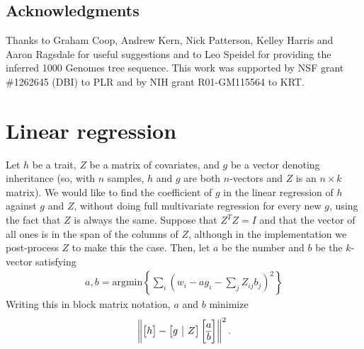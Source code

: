 \documentclass{article}
\begin{document}




\subsection*{Acknowledgments}
Thanks to Graham Coop, Andrew Kern, Nick Patterson, Kelley Harris and
Aaron Ragsdale for useful suggestions
and to Leo Speidel for providing the inferred 1000 Genomes tree sequence.
This work was supported by NSF grant \#1262645 (DBI) to PLR
and by NIH grant R01-GM115564 to KRT.




\clearpage
\appendix
\setcounter{table}{0}
\renewcommand{\thetable}{S\arabic{table}}
\setcounter{figure}{0}
\renewcommand{\thefigure}{S\arabic{figure}}




\appendix

\section{Linear regression}
\label{apx:regression}

Let $h$ be a trait, $Z$ be a matrix of covariates, and $g$ be a vector denoting inheritance
(so, with $n$ samples, $h$ and $g$ are both $n$-vectors and $Z$ is an $n \times k$ matrix).
We would like to find the coefficient of $g$ in the linear regression of $h$ against $g$ and $Z$,
without doing full multivariate regression for every new $g$,
using the fact that $Z$ is always the same.
Suppose that $Z^T Z = I$ and that the vector of all ones is in the span of the columns of $Z$,
although in the implementation we post-process $Z$ to make this the case.
Then, let $a$ be the number and $b$ be the $k$-vector satisfying
\begin{align*}
    a, b = \text{argmin}\left\{ \sum_i \left( w_i - a g_i - \sum_j Z_{ij} b_j \right)^2 \right\}
\end{align*}
Writing this in block matrix notation, $a$ and $b$ minimize
\begin{align*}
    \left\|
        \left[ \begin{array}{@{}c@{}} h \end{array}\right]
            -
        \left[ \begin{array}{@{}c|c@{}} g & Z \end{array} \right]
            \left[ \begin{array}{@{}c@{}} a \\ \hline b \end{array} \right]
    \right\|^2 .
\end{align*}
\end{document}
